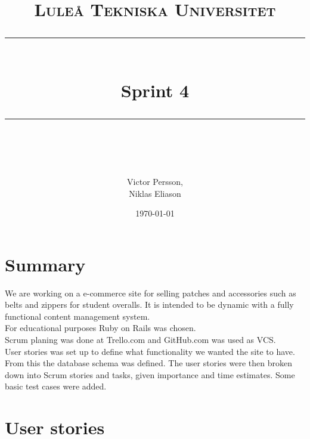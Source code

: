 \documentclass[paper=a4, fontsize=11pt]{report} %
\newcommand{\horrule}[1]{\rule{\linewidth}{#1}}       %
\begin{document}
%
\title{
	\normalfont \normalsize
	\textsc{Luleå Tekniska Universitet} \\ [25pt] %
	\horrule{1pt} \\[0.4cm]                       %
	\huge Sprint 4 \\                             %
	\horrule{1pt} \\[0.5cm]                       %
}
%
\author{Victor Persson,\\ Niklas Eliason}             %
%
\date{\normalsize\today}                              %
%
\maketitle                                            %
%
\tableofcontents
\thispagestyle{empty}
\sectionfont{\scshape}
%
\newpage
\setcounter{page}{1}


\section*{Summary}
	We are working on a e-commerce site for selling patches and accessories such as
	belts and zippers for student overalls. It is intended to be dynamic with a
	fully functional content management system. \\
	For educational purposes Ruby on Rails was chosen. \\
	Scrum planing was done at Trello.com and GitHub.com was used as VCS. \\

	User stories was set up to define what functionality we wanted the site
	to have. From this the database schema was defined. The user
	stories were then broken down into Scrum stories and tasks, given importance
	and time estimates. Some basic test cases were added.



\section*{User stories}
\end{document}
